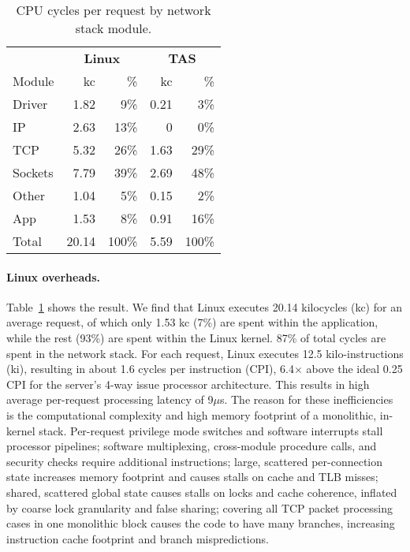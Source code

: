 \begin{table}[t]
\centering
\begin{tabular}{l@{\hskip 4ex}rr@{\hskip 4ex}rr}
  & \multicolumn{2}{c}{\textbf{Linux}} & \multicolumn{2}{c}{\textbf{TAS}}\\
  Module & kc & \% & kc & \%\\
  \midrule
  Driver    &  1.82 &   9\% & 0.21 &  3\% \\
  IP        &  2.63 &  13\% &    0 &  0\% \\
  TCP       &  5.32 &  26\% & 1.63 & 29\% \\
  Sockets   &  7.79 &  39\% & 2.69 & 48\% \\
  Other     &  1.04 &   5\% & 0.15 &  2\% \\
  App       &  1.53 &   8\% & 0.91 & 16\% \\
  \midrule
  Total     & 20.14 & 100\% & 5.59 & 100\%\\
\end{tabular}
\caption{CPU cycles per request by network stack module.}
\label{tab:cycles_breakdown}
\end{table}

\paragraph{Linux overheads.} 
Table~\ref{tab:cycles_breakdown} shows the result. We find that Linux
executes 20.14 kilocycles (kc) for an average request, of which only
1.53 kc (7\%) are spent within the application, while the rest (93\%)
are spent within the Linux kernel. 87\% of total cycles are spent in
the network stack. For each request, Linux executes 12.5
kilo-instructions (ki), resulting in about 1.6 cycles per instruction
(CPI), 6.4$\times$ above the ideal 0.25 CPI for the server's 4-way
issue processor architecture. This results in high average per-request
processing latency of 9$\mu$s. The reason for these inefficiencies is
the computational complexity and high memory footprint of a
monolithic, in-kernel stack. Per-request privilege mode switches and
software interrupts stall processor pipelines; software multiplexing,
cross-module procedure calls, and security checks require additional
instructions; large, scattered per-connection state increases memory
footprint and causes stalls on cache and TLB misses; shared, scattered
global state causes stalls on locks and cache coherence, inflated by
coarse lock granularity and false sharing; covering all TCP packet
processing cases in one monolithic block causes the code to have many
branches, increasing instruction cache footprint and branch
mispredictions.

